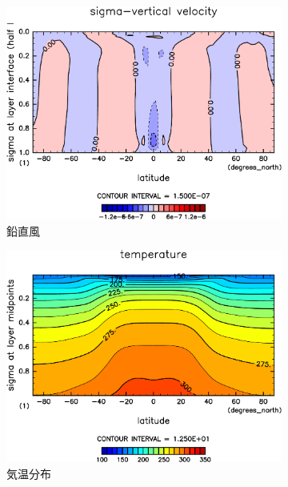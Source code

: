 \documentclass[body]{subfiles}
\begin{document}
\begin{figure}[t]
\begin{subfigure}{.4\textwidth}
		\includegraphics[width=\columnwidth]{S1600/SigDot,time=3650:4015-crop-rotate.pdf}
		\caption{鉛直風}\label{S1600鉛直風}
	\end{subfigure}
	\begin{subfigure}{.4\textwidth}
		\centering
		\includegraphics[width=\columnwidth]{S1600/Temp,time=3650:4015-crop-rotate.pdf}
		\caption{気温分布}\label{S1600気温分布}
	\end{subfigure}
	\begin{subfigure}{.4\textwidth}
		\centering

\end{subfigure}
\end{figure}
\end{document}

